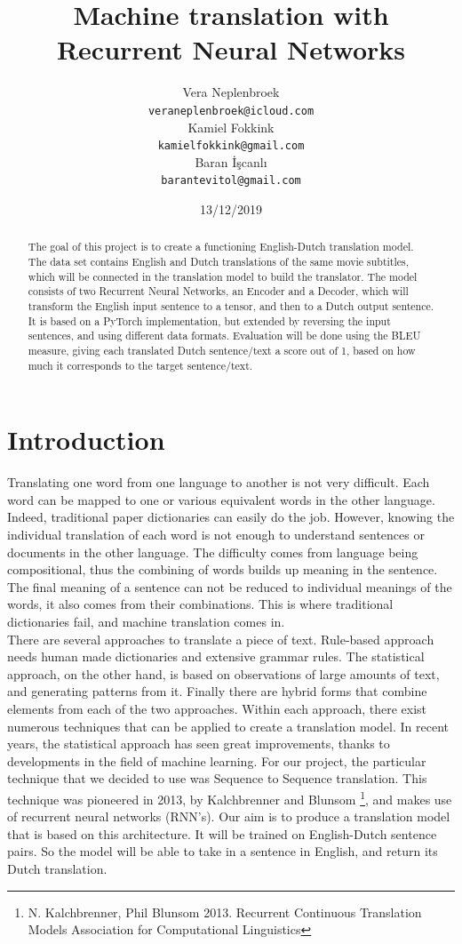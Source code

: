 \documentclass[11pt]{article}
\title{{\LARGE Machine translation with Recurrent Neural Networks}}
\author{Vera Neplenbroek \\
  {\tt veraneplenbroek@icloud.com} \\\And
  Kamiel Fokkink \\
  {\tt kamielfokkink@gmail.com} \\\And
Baran İşcanlı \\
{\tt barantevitol@gmail.com} \\}
\date{13/12/2019}
\begin{document}
\maketitle
\begin{abstract}
  The goal of this project is to create a functioning English-Dutch
  translation model. The data set contains English and Dutch
  translations of the same movie subtitles, which will be connected
  in the translation model to build the translator. The model
  consists of two Recurrent Neural Networks, an Encoder and a Decoder,
  which will transform the English input sentence to a tensor, and
  then to a Dutch output sentence. It is based on a PyTorch
  implementation, but extended by reversing the input sentences, and
  using different data formats. Evaluation will be done using the
  BLEU measure, giving each translated Dutch sentence/text a score
  out of 1, based on how much it corresponds to the target sentence/text.
\end{abstract}

\section{Introduction}

Translating one word from one language to another is not very difficult. Each word can be mapped to one or various equivalent words in the other language. Indeed, traditional paper dictionaries can easily do the job. However, knowing the individual translation of each word is not enough to understand sentences or documents in the other language. The difficulty comes from language being compositional, thus the combining of words builds up meaning in the sentence. The final meaning of a sentence can not be reduced to individual meanings of the words, it also comes from their combinations. This is where traditional dictionaries fail, and machine translation comes in.\\

There are several approaches to translate a piece of text. Rule-based approach needs human made dictionaries and extensive grammar rules. The statistical approach, on the other hand, is based on observations of large amounts of text, and generating patterns from it. Finally there are hybrid forms that combine elements from each of the two approaches. Within each approach, there exist numerous techniques that can be applied to create a translation model. In recent years, the statistical approach has seen great improvements, thanks to developments in the field of machine learning. For our project, the particular technique that we decided to use was Sequence to Sequence translation. This technique was pioneered in 2013, by Kalchbrenner and Blunsom \footnote[1]{N. Kalchbrenner, Phil Blunsom 2013. Recurrent Continuous Translation Models Association for Computational Linguistics}, and makes use of recurrent neural networks (RNN’s). Our aim is to produce a translation model that is based on this architecture. It will be trained on English-Dutch sentence pairs. So the model will be able to take in a sentence in English, and return its Dutch translation.
\end{document}
